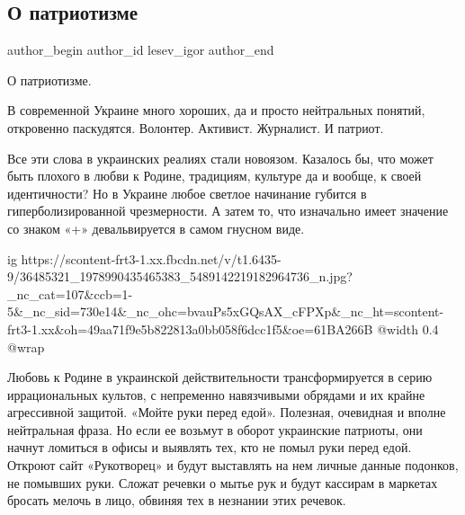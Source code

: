  
 
 
 
 
 
\subsection{О патриотизме}
\label{sec:02_07_2018.fb.lesev_igor.1.o_patriotizme}
 
\ifcmt
 author_begin
   author_id lesev_igor
 author_end
\fi

О патриотизме.

В современной Украине много хороших, да и просто нейтральных понятий,
откровенно паскудятся. Волонтер. Активист. Журналист. И патриот.

Все эти слова в украинских реалиях стали новоязом. Казалось бы, что может быть
плохого в любви к Родине, традициям, культуре да и вообще, к своей
идентичности? Но в Украине любое светлое начинание губится в
гиперболизированной чрезмерности. А затем то, что изначально имеет значение со
знаком «+» девальвируется в самом гнусном виде.

\ifcmt
  ig https://scontent-frt3-1.xx.fbcdn.net/v/t1.6435-9/36485321_1978990435465383_5489142219182964736_n.jpg?_nc_cat=107&ccb=1-5&_nc_sid=730e14&_nc_ohc=bvauPs5xGQsAX_cFPXp&_nc_ht=scontent-frt3-1.xx&oh=49aa71f9e5b822813a0bb058f6dcc1f5&oe=61BA266B
  @width 0.4
  @wrap 
\fi

Любовь к Родине в украинской действительности трансформируется в серию
иррациональных культов, с непременно навязчивыми обрядами и их крайне
агрессивной защитой. «Мойте руки перед едой». Полезная, очевидная и вполне
нейтральная фраза. Но если ее возьмут в оборот украинские патриоты, они начнут
ломиться в офисы и выявлять тех, кто не помыл руки перед едой. Откроют сайт
«Рукотворец» и будут выставлять на нем личные данные подонков, не помывших
руки. Сложат речевки о мытье рук и будут кассирам в маркетах бросать мелочь в
лицо, обвиняя тех в незнании этих речевок.

